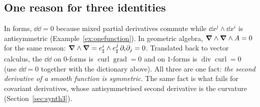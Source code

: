 \subsection{One reason for three identities}

\begin{synthesis}[$\dd\dd=0$, ``curl grad $=0$'' and ``div curl $=0$'']
In forms, $\dd\dd=0$ because mixed partial derivatives commute while $\dd x^j\wedge\dd x^i$ is antisymmetric (Example~\ref{ex:onefunction}). In geometric algebra, $\boldsymbol{\nabla}\wedge\boldsymbol{\nabla}\wedge A=0$ for the same reason: $\boldsymbol{\nabla}\wedge\boldsymbol{\nabla}=e^i_\sharp\wedge e^j_\sharp\,\partial_i\partial_j=0$.
Translated back to vector calculus, the $\dd\dd$ on $0$-forms is $\operatorname{curl}\operatorname{grad}=0$ and on $1$-forms is $\operatorname{div}\operatorname{curl}=0$ (use $\dd\dd=0$ together with the dictionary above). All three are one fact: \emph{the second derivative of a smooth function is symmetric}. The same fact is what fails for covariant derivatives, whose antisymmetrised second derivative is the curvature (Section~\ref{sec:synth3}).
\end{synthesis}
